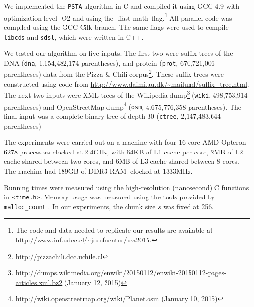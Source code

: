 We implemented the {\tt PSTA} algorithm in C and compiled it using GCC 4.9 with
optimization level -O2 and using the \mbox{-ffast-math flag}.\footnote{The code
  and data needed to replicate our results are available at
  \url{http://www.inf.udec.cl/~josefuentes/sea2015}.}
All parallel code was compiled using the GCC Cilk branch.
The same flags were used to compile {\tt libcds} and {\tt sdsl}, which were
written in C++.

We tested our algorithm on five inputs.
The first two were suffix trees of the DNA ({\tt dna}, 1,154,482,174
parentheses), and protein ({\tt prot}, 670,721,006 parentheses) data from the
Pizza \& Chili corpus\footnote{\url{http://pizzachili.dcc.uchile.cl}}.
These suffix trees were constructed using code from
\url{http://www.daimi.au.dk/~mailund/suffix_tree.html}.
The next two inputs were XML trees of the Wikipedia
dump\footnote{\url{http://dumps.wikimedia.org/enwiki/20150112/enwiki-20150112-pages-articles.xml.bz2} (January 12, 2015)}
({\tt wiki}, 498,753,914 parentheses) and OpenStreetMap
dump\footnote{\url{http://wiki.openstreetmap.org/wiki/Planet.osm} (January 10,
  2015)} ({\tt osm}, 4,675,776,358 parentheses).
The final input was a complete binary tree of depth 30 ({\tt ctree},
2,147,483,644 parentheses).

The experiments were carried out on a machine with four 16-core AMD
Opteron\texttrademark{} 6278 processors clocked at 2.4GHz,
with 64KB of L1 cache per core, 2MB of L2 cache shared
between two cores, and 6MB of L3 cache shared between 8 cores.
The machine had 189GB of DDR3 RAM, clocked at 1333MHz.

Running times were measured using the high-resolution (nanosecond) C functions
in {\tt <time.h>}.
Memory usage was measured using the tools provided by {\tt malloc\_count}
\cite{malloc-count}.
In our experiments, the chunk size $s$ was fixed at 256.
